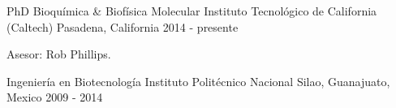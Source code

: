 

\begin{cventries}

  \cventry
    {PhD Bioquímica \& Biofísica Molecular} %
    {Instituto Tecnológico de California (Caltech)} %
    {Pasadena, California} %
    {2014 - presente} %
    {
      \begin{cvitems} %
        \item {Asesor: Rob Phillips.}
      \end{cvitems}
    }

  \cventry
    {Ingeniería en Biotecnología} %
    {Instituto Politécnico Nacional} %
    {Silao, Guanajuato, Mexico} %
    {2009 - 2014} %
    {}
\end{cventries}